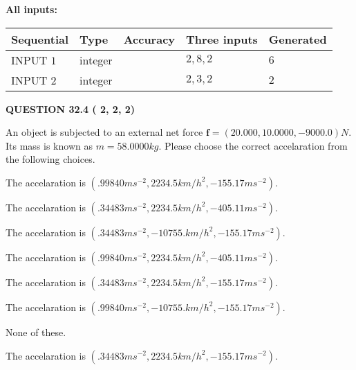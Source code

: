 \documentclass[12pt]{article}
\begin{document}
   
\noindent\vspace{0.1in}\hspace{-0.08in} {\textbf{\Large{All inputs: }}}
   
   
  
  
\noindent\begin{tabular}{|l|l|l|l|l|}
\hline
 Sequential & Type & Accuracy & Three inputs & Generated \\ 
\hline
 
 
  INPUT $           1$ & integer &  & $
 2
 , 
 8
 , 
 2
 $ & $ 6 $ 
 \\  \hline  
 
 
  INPUT $           2$ & integer &  & $
 2
 , 
 3
 , 
 2
 $ & $ 2 $ 
 \\  \hline  
 \end{tabular}
   
   
  
\vspace{0.2in}
  
{\textbf{\Large{QUESTION
32.4 
 (          2,          2,          2)
}}}
  
  
 
An object is subjected to an external net force $\mathbf{f}=(
20.000 ,
10.0000,
-9000.0  )N$. Its mass is known as
$m= %
58.0000  kg$. Please choose the correct accelaration
from the following choices.
 
 
 
The accelaration is
$(
.99840ms^{-2},
2234.5km/h^2,
-155.17ms^{-2}
).
$
 
 
The accelaration is
$(
.34483ms^{-2},
2234.5km/h^2,
-405.11ms^{-2}
).
$
 
 
The accelaration is
$(
.34483ms^{-2},
-10755.km/h^2,
-155.17ms^{-2}
).
$
 
 
The accelaration is
$(
.99840ms^{-2},
2234.5km/h^2,
-405.11ms^{-2}
).
$
 
 
The accelaration is
$(
.34483ms^{-2},
2234.5km/h^2,
-155.17ms^{-2}
).
$
 
 
The accelaration is
$(
.99840ms^{-2},
-10755.km/h^2,
-155.17ms^{-2}
).
$
 
 
 None of these.
 
 
\noindent{}
 
 
The accelaration is
$(
.34483ms^{-2},
2234.5km/h^2,
-155.17ms^{-2}
).
$
 
\end{document}
